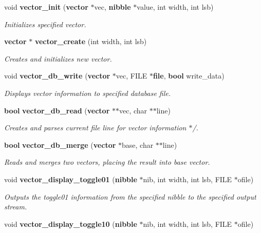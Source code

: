 \begin{CompactItemize}
\item 
void {\bf vector\_\-init} ({\bf vector} $\ast$vec, {\bf nibble} $\ast$value, int width, int lsb)
\begin{CompactList}\small\item\em Initializes specified vector.\item\end{CompactList}\item 
{\bf vector} $\ast$ {\bf vector\_\-create} (int width, int lsb)
\begin{CompactList}\small\item\em Creates and initializes new vector.\item\end{CompactList}\item 
void {\bf vector\_\-db\_\-write} ({\bf vector} $\ast$vec, FILE $\ast${\bf file}, {\bf bool} write\_\-data)
\begin{CompactList}\small\item\em Displays vector information to specified database file.\item\end{CompactList}\item 
{\bf bool} {\bf vector\_\-db\_\-read} ({\bf vector} $\ast$$\ast$vec, char $\ast$$\ast$line)
\begin{CompactList}\small\item\em Creates and parses current file line for vector information $\ast$/.\item\end{CompactList}\item 
{\bf bool} {\bf vector\_\-db\_\-merge} ({\bf vector} $\ast$base, char $\ast$$\ast$line)
\begin{CompactList}\small\item\em Reads and merges two vectors, placing the result into base vector.\item\end{CompactList}\item 
void {\bf vector\_\-display\_\-toggle01} ({\bf nibble} $\ast$nib, int width, int lsb, FILE $\ast$ofile)
\begin{CompactList}\small\item\em Outputs the toggle01 information from the specified nibble to the specified output stream.\item\end{CompactList}\item 
void {\bf vector\_\-display\_\-toggle10} ({\bf nibble} $\ast$nib, int width, int lsb, FILE $\ast$ofile)
$$
\end{CompactItemize}
